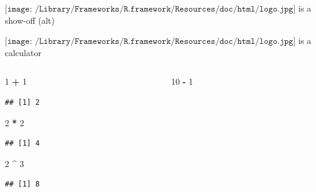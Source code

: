 \documentclass[
  ignorenonframetext,
]{beamer}
\newenvironment{Shaded}{\begin{snugshade}}{\end{snugshade}}
\newcommand{\DecValTok}[1]{\textcolor[rgb]{0.00,0.00,0.81}{#1}}
\newcommand{\SpecialCharTok}[1]{\textcolor[rgb]{0.81,0.36,0.00}{\textbf{#1}}}
\begin{document}
\begin{frame}[fragile]{\(\texttt{[image: /Library/Frameworks/R.framework/Resources/doc/html/logo.jpg]}\)
is a show-off (alt)}
\end{frame}

\begin{frame}[fragile]{\(\texttt{[image: /Library/Frameworks/R.framework/Resources/doc/html/logo.jpg]}\)
is a calculator}
\protect\hypertarget{includegraphicsheight1emlibraryframeworksr.frameworkresourcesdochtmllogo.jpg-is-a-calculator}{}
\begin{columns}[T]
\begin{column}{0.5\textwidth}
\begin{Shaded}
\begin{Highlighting}[]
\DecValTok{1} \SpecialCharTok{+} \DecValTok{1}
\end{Highlighting}
\end{Shaded}

\begin{verbatim}
## [1] 2
\end{verbatim}

\begin{Shaded}
\begin{Highlighting}[]
\DecValTok{2} \SpecialCharTok{*} \DecValTok{2}
\end{Highlighting}
\end{Shaded}

\begin{verbatim}
## [1] 4
\end{verbatim}

\begin{Shaded}
\begin{Highlighting}[]
\DecValTok{2} \SpecialCharTok{\^{}} \DecValTok{3}
\end{Highlighting}
\end{Shaded}

\begin{verbatim}
## [1] 8
\end{verbatim}
\end{column}

\begin{column}{0.5\textwidth}
\begin{Shaded}
\begin{Highlighting}[]
\DecValTok{10} \SpecialCharTok{{-}} \DecValTok{1}
\end{Highlighting}
\end{Shaded}


\end{column}
\end{columns}
\end{frame}
\end{document}

